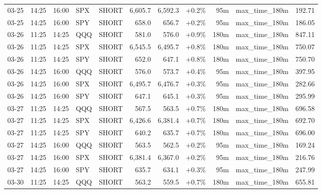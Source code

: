 \documentclass[11pt,a4paper,twoside]{article}
\begin{document}
\begin{center}
\begin{longtable}{>{\color{txtmain}}l l l l l r r r r >{\color{txtmain}}l r}
03-25 & 14:25 & 16:00 & SPX & SHORT & 6,605.7 & 6,592.3 & \textcolor{wingreen}{+0.2\%} & 95m & max\_time\_180m & \textcolor{wingreen}{192.71} \\
03-25 & 14:25 & 16:00 & SPY & SHORT & 658.0 & 656.7 & \textcolor{wingreen}{+0.2\%} & 95m & max\_time\_180m & \textcolor{wingreen}{186.05} \\
03-26 & 11:25 & 14:25 & QQQ & SHORT & 581.0 & 576.0 & \textcolor{wingreen}{+0.9\%} & 180m & max\_time\_180m & \textcolor{wingreen}{847.11} \\
03-26 & 11:25 & 14:25 & SPX & SHORT & 6,545.5 & 6,495.7 & \textcolor{wingreen}{+0.8\%} & 180m & max\_time\_180m & \textcolor{wingreen}{750.07} \\
03-26 & 11:25 & 14:25 & SPY & SHORT & 652.0 & 647.1 & \textcolor{wingreen}{+0.8\%} & 180m & max\_time\_180m & \textcolor{wingreen}{750.70} \\
03-26 & 14:25 & 16:00 & QQQ & SHORT & 576.0 & 573.7 & \textcolor{wingreen}{+0.4\%} & 95m & max\_time\_180m & \textcolor{wingreen}{397.95} \\
03-26 & 14:25 & 16:00 & SPX & SHORT & 6,495.7 & 6,476.7 & \textcolor{wingreen}{+0.3\%} & 95m & max\_time\_180m & \textcolor{wingreen}{282.66} \\
03-26 & 14:25 & 16:00 & SPY & SHORT & 647.1 & 645.1 & \textcolor{wingreen}{+0.3\%} & 95m & max\_time\_180m & \textcolor{wingreen}{295.99} \\
03-27 & 11:25 & 14:25 & QQQ & SHORT & 567.5 & 563.5 & \textcolor{wingreen}{+0.7\%} & 180m & max\_time\_180m & \textcolor{wingreen}{696.58} \\
03-27 & 11:25 & 14:25 & SPX & SHORT & 6,426.6 & 6,381.4 & \textcolor{wingreen}{+0.7\%} & 180m & max\_time\_180m & \textcolor{wingreen}{692.70} \\
03-27 & 11:25 & 14:25 & SPY & SHORT & 640.2 & 635.7 & \textcolor{wingreen}{+0.7\%} & 180m & max\_time\_180m & \textcolor{wingreen}{696.00} \\
03-27 & 14:25 & 16:00 & QQQ & SHORT & 563.5 & 562.5 & \textcolor{wingreen}{+0.2\%} & 95m & max\_time\_180m & \textcolor{wingreen}{169.24} \\
03-27 & 14:25 & 16:00 & SPX & SHORT & 6,381.4 & 6,367.0 & \textcolor{wingreen}{+0.2\%} & 95m & max\_time\_180m & \textcolor{wingreen}{216.76} \\
03-27 & 14:25 & 16:00 & SPY & SHORT & 635.7 & 634.1 & \textcolor{wingreen}{+0.3\%} & 95m & max\_time\_180m & \textcolor{wingreen}{247.99} \\
03-30 & 11:25 & 14:25 & QQQ & SHORT & 563.2 & 559.5 & \textcolor{wingreen}{+0.7\%} & 180m & max\_time\_180m & \textcolor{wingreen}{655.81} \\

\end{longtable}
\end{center}
\end{document}
